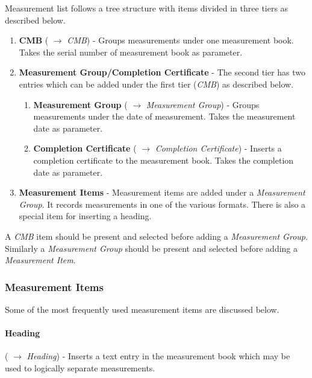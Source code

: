 \documentclass[twoside,a4paper]{refart}
\newenvironment{noteblock}[1]%
{\begin{mdframed}[topline=false,bottomline=false, rightline=false,
		linewidth=2pt, frametitle={#1}]}%
		{\end{mdframed}}
\begin{document}
	 Measurement list follows a tree structure with items divided in three tiers as described below.
	 
	 \begin{enumerate}
	 	\item \textbf{CMB} (\fbox{\emph{$+$}} $\rightarrow$ \emph{CMB}) - Groups measurements under one measurement book. Takes the serial number of measurement book as parameter.
	 	\item \textbf{Measurement Group/Completion Certificate} - The second tier has two entries which can be added under the first tier (\emph{CMB}) as described below.
	 	\begin{enumerate}
	 		\item \textbf{Measurement Group} (\fbox{\emph{$+$}} $\rightarrow$ \emph{Measurement Group}) - Groups measurements under the date of measurement. Takes the measurement date as parameter.
	 		\item \textbf{Completion Certificate} (\fbox{\emph{$+$}} $\rightarrow$ \emph{Completion Certificate}) - Inserts a completion certificate to the measurement book. Takes the completion date as parameter.
	 	\end{enumerate}
	 	\item \textbf{Measurement Items} - Measurement items are added under a \emph{Measurement Group}. It records  measurements in one of the various formats. There is also a special item for inserting a heading.
	 \end{enumerate}
	 
	 \begin{noteblock}{Note:}
	 	A \emph{CMB} item should be present and selected before adding a \emph{Measurement Group}. Similarly a \emph{Measurement Group} should be present and selected before adding a \emph{Measurement Item}.
	 \end{noteblock}
	 
	 \subsubsection{Measurement Items}
	 
	 Some of the most frequently used measurement items are discussed below.
	 
	 \paragraph{Heading} (\fbox{\emph{$+$}} $\rightarrow$ \emph{Heading}) - Inserts a text entry in the measurement book which may be used to logically separate measurements.
	 
\end{document}
